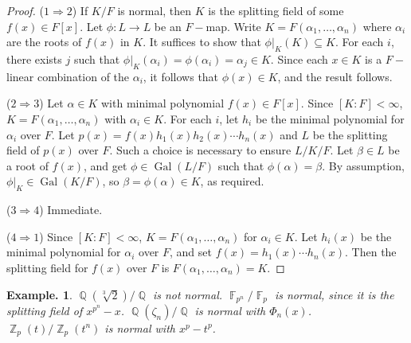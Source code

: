\documentclass[11pt, a4paper]{memoir}
\DeclareMathOperator{\Q}{{\mathbb{Q}}}
\DeclareMathOperator{\Z}{{\mathbb{Z}}}
\DeclareMathOperator{\F}{{\mathbb{F}}}
\newcommand{\imp}[2]{($#1\Rightarrow#2$)\hspace{0.2cm}}
\theoremstyle{change}
\theoremstyle{plain}
\theoremstyle{nonumberplain}
\newtheorem{example}{Example.}
\newtheorem{proof}{Proof}
\DeclareMathOperator{\Gal}{Gal}
\numberwithin{equation}{section}
\begin{document}
\begin{proof}
    \imp{1}{2}
    If $K/F$ is normal, then $K$ is the splitting field of some $f(x)\in F[x]$.
    Let $\phi:L\to L$ be an $F-$map.
    Write $K=F(\alpha_1,\ldots,\alpha_n)$ where $\alpha_i$ are the roots of $f(x)$ in $K$.
    It suffices to show that $\phi|_K(K)\subseteq K$.
    For each $i$, there exists $j$ such that $\phi|_K(\alpha_i)=\phi(\alpha_i)=\alpha_j\in K$.
    Since each $x\in K$ is a $F-$linear combination of the $\alpha_i$, it follows that $\phi(x)\in K$, and the result follows.

    \imp{2}{3}
    Let $\alpha\in K$ with minimal polynomial $f(x)\in F[x]$.
    Since $[K:F]<\infty$, $K=F(\alpha_1,\ldots,\alpha_n)$ with $\alpha_i\in K$.
    For each $i$, let $h_i$ be the minimal polynomial for $\alpha_i$ over $F$.
    Let $p(x)=f(x)h_1(x)h_2(x)\cdots h_n(x)$ and $L$ be the splitting field of $p(x)$ over $F$.
    Such a choice is necessary to ensure $L/K/F$.
    Let $\beta\in L$ be a root of $f(x)$, and get $\phi\in\Gal(L/F)$ such that $\phi(\alpha)=\beta$.
    By assumption, $\phi|_K\in\Gal(K/F)$, so $\beta=\phi(\alpha)\in K$, as required.

    \imp{3}{4}
    Immediate.

    \imp{4}{1}
    Since $[K:F]<\infty$, $K=F(\alpha_1,\ldots,\alpha_n)$ for $\alpha_i\in K$.
    Let $h_i(x)$ be the minimal polynomial for $\alpha_i$ over $F$, and set $f(x)=h_1(x)\cdots h_n(x)$.
    Then the splitting field for $f(x)$ over $F$ is $F(\alpha_1,\ldots,\alpha_n)=K$.
\end{proof}
\begin{example}
    $\Q(\sqrt[3]{2})/\Q$ is not normal.
    $\F_{p^n}/\F_p$ is normal, since it is the splitting field of $x^{p^n}-x$.
    $\Q(\zeta_n)/\Q$ is normal with $\Phi_n(x)$.
    $\Z_p(t)/\Z_p(t^n)$ is normal with $x^p-t^p$.
\end{example}
\end{document}
